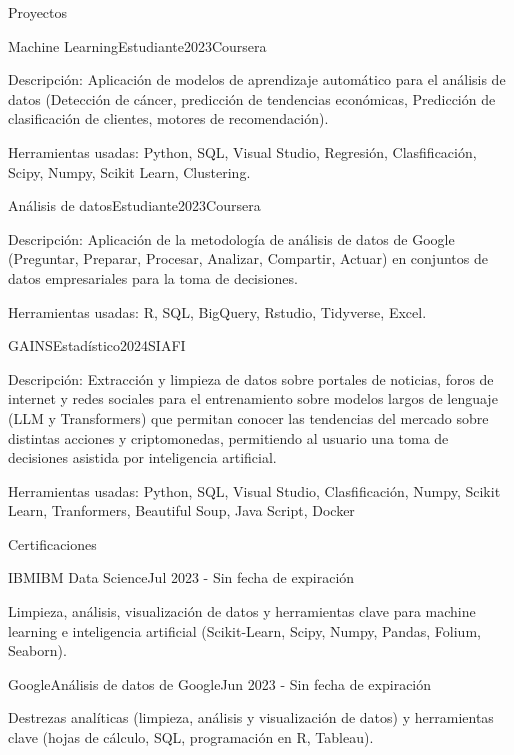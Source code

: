 \documentclass[]{kyvernitis-resume}
\begin{document}
\begin{section}{Proyectos}
\begin{subsectionnobullet}{Machine Learning}{Estudiante}{2023}{Coursera}
    \item Descripción: Aplicación de modelos de aprendizaje automático para el análisis de datos (Detección de cáncer, predicción de tendencias económicas, Predicción de clasificación de clientes, motores de recomendación).
    \item Herramientas usadas: Python, SQL, Visual Studio, Regresión, Clasfificación, Scipy, Numpy, Scikit Learn, Clustering.
\end{subsectionnobullet}

\begin{subsectionnobullet}{Análisis de datos}{Estudiante}{2023}{Coursera}
    \item Descripción: Aplicación de la metodología de análisis de datos de Google (Preguntar, Preparar, Procesar, Analizar, Compartir, Actuar) en conjuntos de datos empresariales para la toma de decisiones.
    \item Herramientas usadas: R, SQL, BigQuery, Rstudio, Tidyverse, Excel.
\end{subsectionnobullet}

\begin{subsectionnobullet}{GAINS}{Estadístico}{2024}{SIAFI}
	\item Descripción: Extracción y limpieza de datos sobre portales de noticias, foros de internet y redes sociales para el entrenamiento sobre modelos largos de lenguaje (LLM y Transformers) que permitan conocer las tendencias del mercado sobre distintas acciones y criptomonedas, permitiendo al usuario una toma de decisiones asistida por inteligencia artificial.
	\item Herramientas usadas: Python, SQL, Visual Studio, Clasfificación, Numpy, Scikit Learn, Tranformers, Beautiful Soup, Java Script, Docker
\end{subsectionnobullet}

\end{section}

\begin{section}{Certificaciones}
    \begin{subsectionnobullet}{IBM}{IBM Data Science}{Jul 2023 - Sin fecha de expiración}{}
        \item Limpieza, análisis, visualización de datos y herramientas clave para machine learning e inteligencia artificial (Scikit-Learn, Scipy, Numpy, Pandas, Folium, Seaborn).
    \end{subsectionnobullet}
    
    \begin{subsectionnobullet}{Google}{Análisis de datos de Google}{Jun 2023 - Sin fecha de expiración}{}
        \item Destrezas analíticas (limpieza, análisis y visualización de datos) y herramientas clave (hojas de cálculo, SQL, programación en R, Tableau).
    \end{subsectionnobullet}
\end{section}


\end{document}
